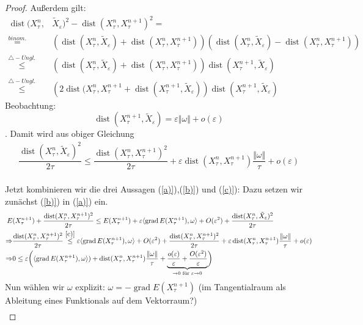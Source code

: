 \documentclass[11pt,a4paper,notitlepage]{scrreprt}
\newcommand{\dist}{\operatorname{dist}}
\newcommand{\grad}{\operatorname{grad}}
\begin{document}
\begin{proof}
Außerdem gilt:
\begin{align*}
\dist (X_\tau^n,&\tilde{X}_\varepsilon)^2-\dist(X_\tau^n,X_\tau^{n+1})^2=\\
\overset{binom.}=&\left(\dist(X_\tau^n,\tilde{X}_\varepsilon)+\dist(X_\tau^n,X_\tau^{n+1})\right)\left(\dist(X_\tau^n,\tilde{X}_\varepsilon)-\dist(X_\tau^n,X_\tau^{n+1})\right)\\
\overset{\triangle-Ungl.}\leq& \left(\dist(X_\tau^n,\tilde{X}_\varepsilon)+\dist(X_\tau^n,X_\tau^{n+1})\right)\dist(X_\tau^{n+1},\tilde{X}_\varepsilon) \\
\overset{\triangle-Ungl.}\leq&\left(2\dist(X_\tau^n,X_\tau^{n+1}+\dist(X_\tau^{n+1},\tilde{X}_\varepsilon)\right)\dist(X_\tau^{n+1},\tilde{X}_\varepsilon)
\end{align*}
Beobachtung: \[\dist(X_\tau^{n+1},\tilde{X}_\varepsilon)=\varepsilon\Vert \omega \Vert + o(\varepsilon) \].
Damit wird aus obiger Gleichung
\begin{eqnarray}
\dfrac{\dist(X_\tau^n,\tilde{X}_\varepsilon)^2}{2\tau}\leq \dfrac{\dist(X_\tau^n,X_\tau^{n+1})^2}{2\tau}+\varepsilon\dist(X_\tau^n,X_\tau^{n+1})\dfrac{\Vert \omega \Vert}{\tau} + o(\varepsilon) \label{c)}
\end{eqnarray}
\\
Jetzt kombinieren wir die drei Aussagen (\ref{a)}),(\ref{b)}) und (\ref{c)}): Dazu setzen wir zunächst (\ref{b)}) in (\ref{a)}) ein.
\begin{align*}
E&(X_\tau^{n+1})+\dfrac{\dist(X_\tau^n,X_\tau^{n+1})^2}{2\tau}\leq E(X_\tau^{n+1})+\varepsilon\langle \grad E(X_\tau^{n+1}),\omega\rangle+O(\varepsilon^2)+\dfrac{\dist(X_\tau^n,\tilde{X}_\varepsilon)^2}{2\tau}
\\
\Rightarrow& \dfrac{\dist(X_\tau^n,X_\tau^{n+1})^2}{2\tau}\overset{\ref{c)}}{\leq} \varepsilon\langle \grad E(X_\tau^{n+1}),\omega\rangle+O(\varepsilon^2)+ \dfrac{\dist(X_\tau^n,X_\tau^{n+1})^2}{2\tau}+\varepsilon\dist(X_\tau^n,X_\tau^{n+1})\dfrac{\Vert \omega \Vert}{\tau} + o(\varepsilon)\\
\Rightarrow& 0\leq \varepsilon \bigg(\langle \grad E(X_\tau^{n+1}),\omega\rangle)+\dist(X_\tau^n,X_\tau^{n+1})\dfrac{\Vert \omega \Vert}{\tau} +\underset{\to 0 \text{ für } \varepsilon \to 0} {\underbrace{\dfrac{o(\varepsilon)}{\varepsilon}+\dfrac{O(\varepsilon^2)}{\varepsilon}}} \bigg)
\end{align*}
Nun wählen wir $\omega$ explizit: $\omega=-\grad E(X_\tau^{n+1})$ (im Tangentialraum als Ableitung eines Funktionals auf dem Vektorraum?)
\begin{align*}

\end{align*}
\end{proof}
\end{document}
